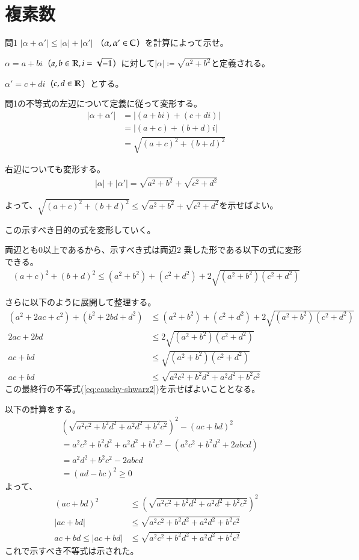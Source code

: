 \chapter{複素数}%

\begin{mysimplebox}{問1}
$|\alpha+\alpha'|\le|\alpha|+|\alpha'|$
（$\alpha,\alpha'\in\mathbb{C}$）を計算によって示せ。
\end{mysimplebox}

$\alpha=a+bi$（$a, b\in\mathbb{R}, i=\sqrt{-1}$）に対して$|\alpha|\coloneqq\sqrt{a^2+b^2}$と定義される。

$\alpha'=c+di$（$c,d\in\mathbb{R}$）とする。

問1の不等式の左辺について定義に従って変形する。
\begin{align*}
    |\alpha+\alpha'|&=|(a+bi)+(c+di)|\\
    &=|(a+c)+(b+d)i|\\
    &=\sqrt{(a+c)^2+(b+d)^2}
\end{align*}

右辺についても変形する。
\begin{align*}
    |\alpha|+|\alpha'|=\sqrt{a^2+b^2}+\sqrt{c^2+d^2}
\end{align*}

よって、$\sqrt{(a+c)^2+(b+d)^2}\le\sqrt{a^2+b^2}+\sqrt{c^2+d^2}$を示せばよい。

この示すべき目的の式を変形していく。

両辺とも0以上であるから、示すべき式は両辺2
乗した形である以下の式に変形できる。
\begin{align*}
    (a+c)^2+(b+d)^2\le(a^2+b^2)+(c^2+d^2)+2\sqrt{(a^2+b^2)(c^2+d^2)}
\end{align*}

さらに以下のように展開して整理する。
\begin{align}
    (a^2+2ac+c^2)+(b^2+2bd+d^2)&\le (a^2+b^2)+(c^2+d^2)+2\sqrt{(a^2+b^2)(c^2+d^2)}\nonumber\\
    2ac+2bd&\le 2\sqrt{(a^2+b^2)(c^2+d^2)}\nonumber\\
    ac+bd&\le \sqrt{(a^2+b^2)(c^2+d^2)}\label{eq:cauchy-shwarz}\\
    ac+bd&\le \sqrt{a^2c^2+b^2d^2+a^2d^2+b^2c^2}\label{eq:cauchy-shwarz2}
\end{align}
この最終行の不等式(\ref{eq:cauchy-shwarz2})を示せばよいこととなる。

以下の計算をする。
\begin{align}
    &\left(\sqrt{a^2c^2+b^2d^2+a^2d^2+b^2c^2}\right)^2-(ac+bd)^2\nonumber\\
    &=a^2c^2+b^2d^2+a^2d^2+b^2c^2-(a^2c^2+b^2d^2+2abcd)\nonumber\\
    &=a^2d^2+b^2c^2-2abcd\nonumber\\
    &=(ad-bc)^2\ge0\label{eq:togo}
\end{align}
よって、
\begin{align*}
    (ac+bd)^2&\le\left(\sqrt{a^2c^2+b^2d^2+a^2d^2+b^2c^2}\right)^2\\
    |ac+bd|&\le\sqrt{a^2c^2+b^2d^2+a^2d^2+b^2c^2}\\
    ac+bd\le|ac+bd|&\le\sqrt{a^2c^2+b^2d^2+a^2d^2+b^2c^2}
\end{align*}
これで示すべき不等式は示された。

